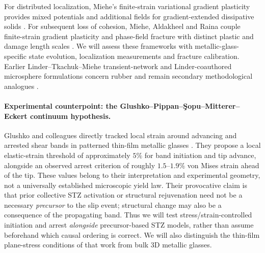 \documentclass[11pt,a4paper]{article}
\begin{document}
For distributed localization, Miehe's finite-strain variational gradient plasticity provides mixed potentials and additional fields for gradient-extended dissipative solids \cite{miehegradient2014}. For subsequent loss of cohesion, Miehe, Aldakheel and Raina couple finite-strain gradient plasticity and phase-field fracture with distinct plastic and damage length scales \cite{mieheductile2016}. We will assess these frameworks with metallic-glass-specific state evolution, localization measurements and fracture calibration. Earlier Linder--Tkachuk--Miehe transient-network and Linder-coauthored microsphere formulations concern rubber and remain secondary methodological analogues \cite{lindermiehe2011,linder2023}.

\paragraph{Experimental counterpoint: the Glushko--Pippan--\c{S}opu--Mitterer--Eckert continuum hypothesis.}
Glushko and colleagues directly tracked local strain around advancing and arrested shear bands in patterned thin-film metallic glasses \cite{glushko2024}. They propose a local elastic-strain threshold of approximately $5\%$ for band initiation and tip advance, alongside an observed arrest criterion of roughly $1.5$--$1.9\%$ von Mises strain ahead of the tip. These values belong to their interpretation and experimental geometry, not a universally established microscopic yield law. Their provocative claim is that prior collective STZ activation or structural rejuvenation need not be a necessary \emph{precursor} to the slip event; structural change may also be a consequence of the propagating band. Thus we will test stress/strain-controlled initiation and arrest \emph{alongside} precursor-based STZ models, rather than assume beforehand which causal ordering is correct. We will also distinguish the thin-film plane-stress conditions of that work from bulk 3D metallic glasses.
\end{document}
